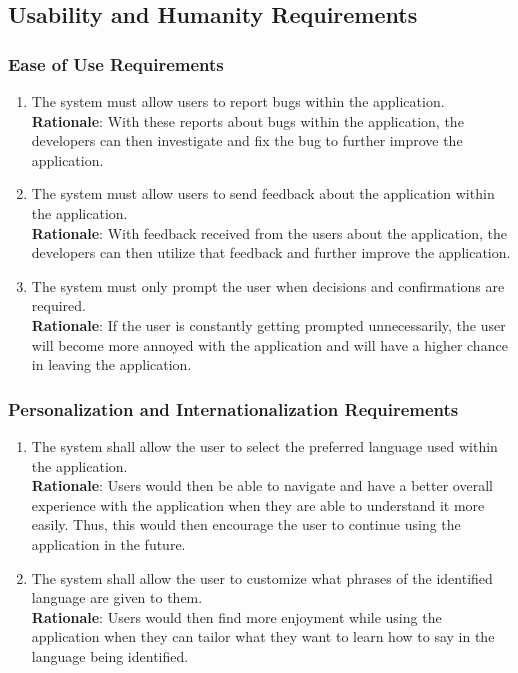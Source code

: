 

\subsection{Usability and Humanity Requirements}
\label{sub:usability_and_humanity_requirements}

\subsubsection{Ease of Use Requirements}
\label{ssub:ease_of_use_requirements}
\begin{enumerate}[{UH-EOU}1. ]
	\item The system must allow users to report bugs within the application.
	\\ \textbf{Rationale}: With these reports about bugs within the application, the developers can then investigate and fix the bug to further improve the application.
	\item The system must allow users to send feedback about the application within the application.
	\\ \textbf{Rationale}: With feedback received from the users about the application, the developers can then utilize that feedback and further improve the application.
	\item The system must only prompt the user when decisions and confirmations are required.
	\\ \textbf{Rationale}: If the user is constantly getting prompted unnecessarily, the user will become more annoyed with the application and will have a higher chance in leaving the application.
\end{enumerate}


\subsubsection{Personalization and Internationalization Requirements}
\label{ssub:personalization_and_internationalization_requirements}
\begin{enumerate}[{UH-PI}1. ]
	\item The system shall allow the user to select the preferred language used within the application.
	\\ \textbf{Rationale}: Users would then be able to navigate and have a better overall experience with the application when they are able to understand it more easily. Thus, this would then encourage the user to continue using the application in the future.
	\item The system shall allow the user to customize what phrases of the identified language are given to them.
	\\ \textbf{Rationale}: Users would then find more enjoyment while using the application when they can tailor what they want to learn how to say in the language being identified.
\end{enumerate}


